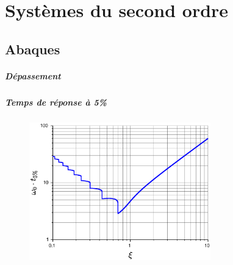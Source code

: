 \chapter{Systèmes du second ordre\label{annexe-2nd}}
\newpage

\section{Abaques}


\paragraph{Dépassement}
\begin{figure}[!h]
\begin{center}
        
\end{center}
\end{figure}

\paragraph{Temps de réponse à 5\%}
\begin{figure}[!hb]
    \centering
    \includegraphics[width=0.7\textwidth]{scilab/fig_temps_de_reduit.eps}
\end{figure}




